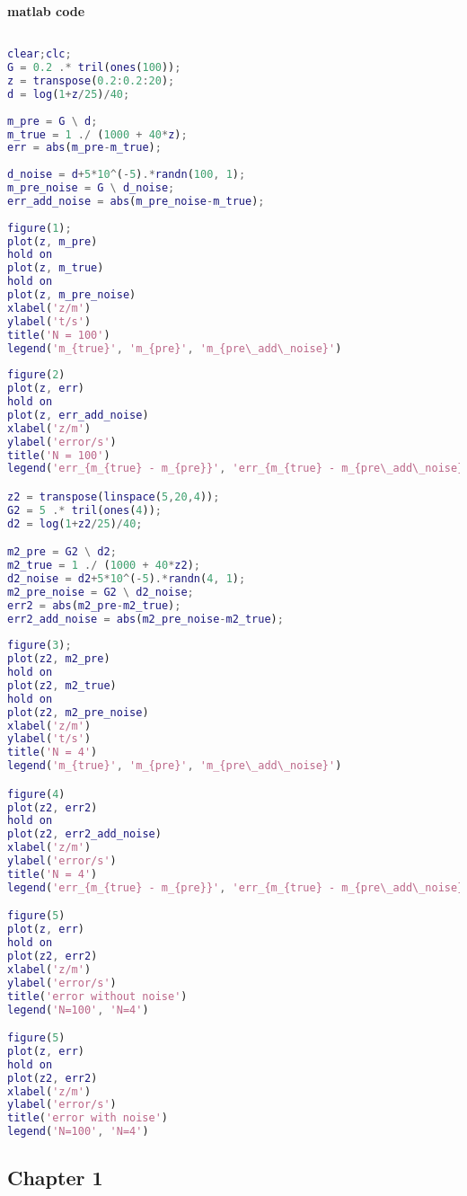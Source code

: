 \documentclass{article}
\begin{document}
\textbf{matlab code}
\begin{lstlisting}[language={matlab}]

clear;clc;
G = 0.2 .* tril(ones(100));
z = transpose(0.2:0.2:20);
d = log(1+z/25)/40;
    
m_pre = G \ d;
m_true = 1 ./ (1000 + 40*z);
err = abs(m_pre-m_true);
    
d_noise = d+5*10^(-5).*randn(100, 1);
m_pre_noise = G \ d_noise;
err_add_noise = abs(m_pre_noise-m_true);
    
figure(1);
plot(z, m_pre)
hold on
plot(z, m_true)
hold on 
plot(z, m_pre_noise)
xlabel('z/m')
ylabel('t/s')
title('N = 100')
legend('m_{true}', 'm_{pre}', 'm_{pre\_add\_noise}')
    
figure(2)
plot(z, err)
hold on
plot(z, err_add_noise)
xlabel('z/m')
ylabel('error/s')
title('N = 100')
legend('err_{m_{true} - m_{pre}}', 'err_{m_{true} - m_{pre\_add\_noise}}')

z2 = transpose(linspace(5,20,4));
G2 = 5 .* tril(ones(4));
d2 = log(1+z2/25)/40;

m2_pre = G2 \ d2;
m2_true = 1 ./ (1000 + 40*z2);
d2_noise = d2+5*10^(-5).*randn(4, 1);
m2_pre_noise = G2 \ d2_noise;
err2 = abs(m2_pre-m2_true);
err2_add_noise = abs(m2_pre_noise-m2_true);
        
figure(3);
plot(z2, m2_pre)
hold on
plot(z2, m2_true)
hold on 
plot(z2, m2_pre_noise)
xlabel('z/m')
ylabel('t/s')
title('N = 4')
legend('m_{true}', 'm_{pre}', 'm_{pre\_add\_noise}')

figure(4)
plot(z2, err2)
hold on
plot(z2, err2_add_noise)
xlabel('z/m')
ylabel('error/s')
title('N = 4')
legend('err_{m_{true} - m_{pre}}', 'err_{m_{true} - m_{pre\_add\_noise}}')

figure(5)
plot(z, err)
hold on 
plot(z2, err2)
xlabel('z/m')
ylabel('error/s')
title('error without noise')
legend('N=100', 'N=4')

figure(5)
plot(z, err)
hold on 
plot(z2, err2)
xlabel('z/m')
ylabel('error/s')
title('error with noise')
legend('N=100', 'N=4')

\end{lstlisting}

\pagebreak

\begin{center}
\section{Chapter 1}
\end{center}
\end{document}
